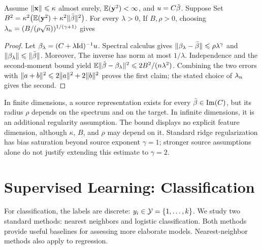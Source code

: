 \begin{thm}
Assume $\lVert\mathbf{x}\rVert\leqslant\kappa$ almost surely, $\mathbb{E}(\mathbf{y}^2)<\infty$, and $u=C\bar{\beta}$. Suppose
Set $B^2=\kappa^2\bigl(\mathbb{E}(\mathbf{y}^2)+\kappa^2\lVert\bar{\beta}\rVert^2\bigr)$. For every $\lambda>0$,
If $B,\rho>0$, choosing $\lambda_n=(B/(\rho\sqrt n))^{1/(\gamma+1)}$ gives
\end{thm}
\begin{proof}
Let $\beta_\lambda=(C+\lambda\mathrm{Id})^{-1}u$. Spectral calculus gives
$\lVert\beta_\lambda-\bar{\beta}\rVert\leqslant\rho\lambda^\gamma$ and $\lVert\beta_\lambda\rVert\leqslant\lVert\bar{\beta}\rVert$. Moreover,
The inverse has norm at most $1/\lambda$. Independence and the second-moment bound yield
$\mathbb{E}\lVert\hat{\beta}-\beta_\lambda\rVert^2\leqslant2B^2/(n\lambda^2)$. Combining the two errors with $\lVert a+b\rVert^2\leqslant2\lVert a\rVert^2+2\lVert b\rVert^2$ proves the first claim; the stated choice of $\lambda_n$ gives the second.
\end{proof}

In finite dimensions, a source representation exists for every $\bar{\beta}\in\operatorname{Im}(C)$, but its radius $\rho$ depends on the spectrum and on the target. In infinite dimensions, it is an additional regularity assumption. The bound displays no explicit feature dimension, although $\kappa$, $B$, and $\rho$ may depend on it. Standard ridge regularization has bias saturation beyond source exponent $\gamma=1$; stronger source assumptions alone do not justify extending this estimate to $\gamma=2$.

\section{Supervised Learning: Classification}
\label{sec-classif}

For classification, the labels are discrete: $y_i \in \mathcal{Y} = \{1,\ldots,k\}$.
%
We study two standard methods: nearest neighbors and logistic classification.
%
Both methods provide useful baselines for assessing more elaborate models.
%
Nearest-neighbor methods also apply to regression.

